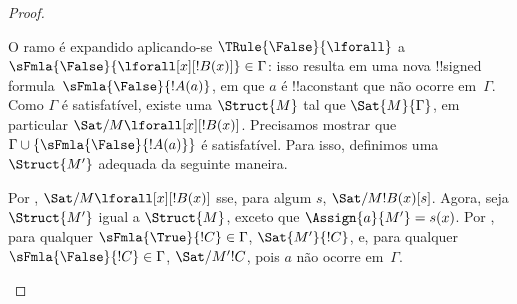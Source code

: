 \documentclass[../../../include/open-logic-section]{subfiles}
\begin{document}
\begin{proof}
\begin{enumerate}
{\item O ramo é expandido aplicando-se $\TRule{\False}{\lforall}$ a
  $\sFmla{\False}{\lforall[x][!B(x)]} \in \Gamma$: isso resulta em uma
  nova !!{signed formula}~$\sFmla{\False}{!A(a)}$, em que $a$ é
  !!a{constant} que não ocorre em~$\Gamma$. Como $\Gamma$ é
  satisfatível, existe uma $\Struct{M}$ tal que $\Sat{M}{\Gamma}$, em
  particular $\Sat/{M}{\lforall[x][!B(x)]}$. Precisamos mostrar que
  $\Gamma \cup \{\sFmla{\False}{!A(a)}\}$ é satisfatível. Para isso,
  definimos uma $\Struct{M'}$ adequada da seguinte maneira.

  Por , $\Sat/{M}{\lforall[x][!B(x)]}$
  sse, para algum $s$, $\Sat/{M}{!B(x)}[s]$. Agora, seja $\Struct{M'}$
  igual a $\Struct{M}$, exceto que $\Assign{a}{M'} = s(x)$. Por
  , para qualquer
  $\sFmla{\True}{!C} \in \Gamma$, $\Sat{M'}{!C}$, e, para qualquer
  $\sFmla{\False}{!C} \in \Gamma$, $\Sat/{M'}{!C}$, pois $a$ não
  ocorre em~$\Gamma$.

}
\end{enumerate}
\end{proof}
\end{document}
